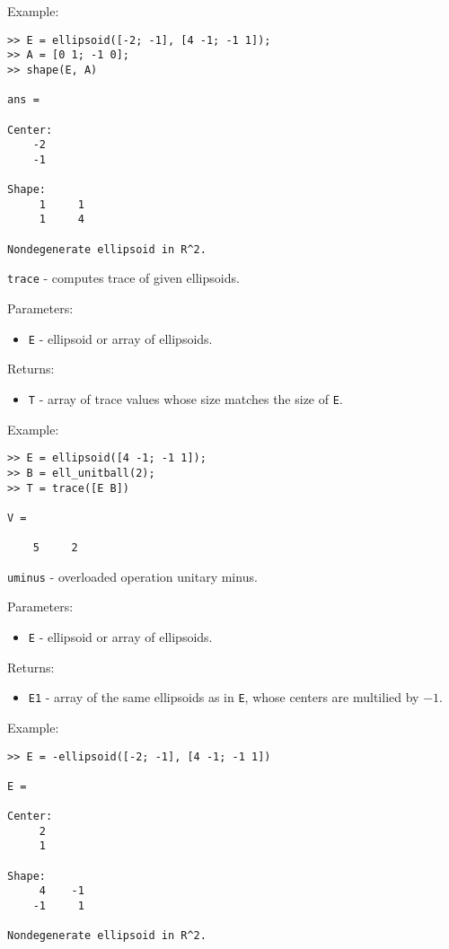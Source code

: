 Example:
{\tt \begin{verbatim}
>> E = ellipsoid([-2; -1], [4 -1; -1 1]);
>> A = [0 1; -1 0];
>> shape(E, A)

ans =

Center:
    -2
    -1

Shape:
     1     1
     1     4

Nondegenerate ellipsoid in R^2.
\end{verbatim} }

\newpage

{\Large {\tt trace}} - computes trace of given ellipsoids.

Parameters:
\begin{itemize}
\item {\tt E} - ellipsoid or array of ellipsoids.
\end{itemize}

Returns:
\begin{itemize}
\item {\tt T} - array of trace values whose size matches the size of {\tt E}.
\end{itemize}

Example:
{\tt \begin{verbatim}
>> E = ellipsoid([4 -1; -1 1]);
>> B = ell_unitball(2);
>> T = trace([E B])

V =

    5     2
\end{verbatim} }

\newpage


{\Large {\tt uminus}} - overloaded operation unitary minus.

Parameters:
\begin{itemize}
\item {\tt E} - ellipsoid or array of ellipsoids.
\end{itemize}

Returns:
\begin{itemize}
\item {\tt E1} - array of the same ellipsoids as in {\tt E}, whose centers
are multilied by $-1$.
\end{itemize}

Example:
{\tt \begin{verbatim}
>> E = -ellipsoid([-2; -1], [4 -1; -1 1])

E =

Center:
     2
     1

Shape:
     4    -1
    -1     1

Nondegenerate ellipsoid in R^2.
\end{verbatim} }

